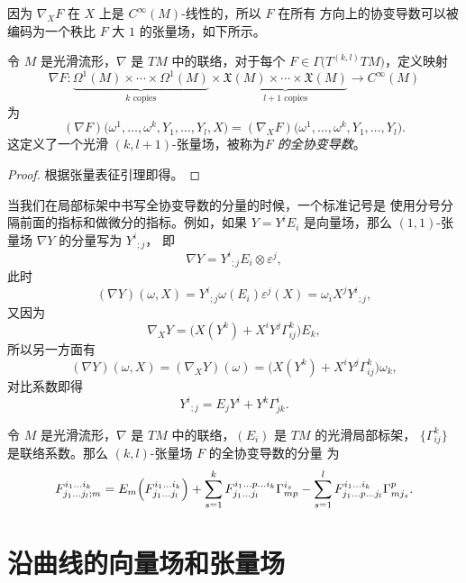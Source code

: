 \documentclass[fontset=none]{Notes}
\begin{document}
因为 $\nabla_XF$ 在 $X$ 上是 $C^\infty(M)$-线性的，所以 $F$ 在所有
方向上的协变导数可以被编码为一个秩比 $F$ 大 $1$ 的张量场，如下所示。

\begin{proposition}[全协变导数]
  令 $M$ 是光滑流形，$\nabla$ 是 $TM$ 中的联络，对于每个
  $F\in\Gamma\bigl(T^{(k,l)}TM\bigr)$，定义映射
  \[
    \nabla F:\underbrace{\Omega^1(M)\times\cdots\times\Omega^1(M)}_{\text{$k$ copies}}
    \times \underbrace{\mathfrak{X}(M)\times\cdots\times \mathfrak{X}(M)}_{\text{$l+1$ copies}}
    \to C^\infty(M)
  \]
  为
  \begin{equation}
    (\nabla F)\bigl(\omega^1,\dots,\omega^k,Y_1,\dots,Y_l,X\bigr)
    =(\nabla_XF)\bigl(\omega^1,\dots,\omega^k,Y_1,\dots,Y_l\bigr).
  \end{equation}
  这定义了一个光滑 $(k,l+1)$-张量场，被称为\emph{$F$ 的全协变导数}。
\end{proposition}
\begin{proof}
  根据张量表征引理即得。
\end{proof}

当我们在局部标架中书写全协变导数的分量的时候，一个标准记号是
使用分号分隔前面的指标和做微分的指标。例如，如果 $Y=Y^iE_i$
是向量场，那么 $(1,1)$-张量场 $\nabla Y$ 的分量写为 ${Y^i}_{;j}$，
即
\[
  \nabla Y=  {Y^i}_{;j}E_i\otimes \varepsilon^j,
\]
此时
\[
  (\nabla Y)(\omega,X)={Y^i}_{;j} \omega(E_i)\varepsilon^j(X)
  =\omega_i X^j{Y^i}_{;j},  
\]
又因为
\[
  \nabla_XY=\bigl(X(Y^k)+X^iY^j\Gamma_{ij}^k\bigr)  E_k,
\]
所以另一方面有
\[  
  (\nabla Y)(\omega,X)=(\nabla_XY)(\omega)=
  \bigl(X(Y^k)+X^iY^j\Gamma_{ij}^k\bigr)\omega_k,
\]
对比系数即得
\[
  {Y^i}_{;j}=E_jY^i+Y^k\Gamma_{jk}^i.  
\]

\begin{proposition}\label{prop:components of total convariant derivative}
  令 $M$ 是光滑流形，$\nabla$ 是 $TM$ 中的联络，$(E_i)$ 是 $TM$ 的光滑局部标架，
  $\{\Gamma_{ij}^k\}$ 是联络系数。那么 $(k,l)$-张量场 $F$ 的全协变导数的分量
  为
  \[
    F_{j_1\dots j_l;m}^{i_1\dots i_k}  =
    E_m\Bigl(F_{j_1\dots j_l}^{i_1\dots i_k}\Bigr)
    +\sum_{s=1}^k F_{j_1\dots j_l}^{i_1\dots p\dots i_k}\Gamma_{mp}^{i_s}
    -\sum_{s=1}^l F_{j_1\dots p\dots j_l}^{i_1\dots i_k}\Gamma_{m j_s}^p.
  \]
\end{proposition}



\section{沿曲线的向量场和张量场}
\end{document}
